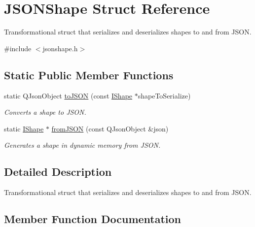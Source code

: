 \hypertarget{struct_j_s_o_n_shape}{}\section{J\+S\+O\+N\+Shape Struct Reference}
\label{struct_j_s_o_n_shape}


Transformational struct that serializes and deserializes shapes to and from J\+S\+ON.  




{\ttfamily \#include $<$jsonshape.\+h$>$}

\subsection*{Static Public Member Functions}
\begin{DoxyCompactItemize}
\item 
static Q\+Json\+Object \mbox{\hyperlink{struct_j_s_o_n_shape_a38bb052953becd55f29000f819aa314d}{to\+J\+S\+ON}} (const \mbox{\hyperlink{class_i_shape}{I\+Shape}} $\ast$shape\+To\+Serialize)
\begin{DoxyCompactList}\small\item\em Converts a shape to J\+S\+ON. \end{DoxyCompactList}\item 
static \mbox{\hyperlink{class_i_shape}{I\+Shape}} $\ast$ \mbox{\hyperlink{struct_j_s_o_n_shape_ae3db5716fcc492a8c2628d77ea04d454}{from\+J\+S\+ON}} (const Q\+Json\+Object \&json)
\begin{DoxyCompactList}\small\item\em Generates a shape in dynamic memory from J\+S\+ON. \end{DoxyCompactList}\end{DoxyCompactItemize}


\subsection{Detailed Description}
Transformational struct that serializes and deserializes shapes to and from J\+S\+ON. 



\subsection{Member Function Documentation}
\mbox{\label{struct_j_s_o_n_shape_ae3db5716fcc492a8c2628d77ea04d454}} 
